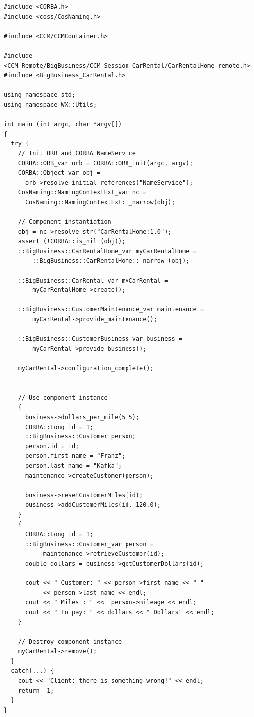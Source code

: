 \begin{small}
\begin{verbatim}
#include <CORBA.h>
#include <coss/CosNaming.h>

#include <CCM/CCMContainer.h>

#include <CCM_Remote/BigBusiness/CCM_Session_CarRental/CarRentalHome_remote.h>
#include <BigBusiness_CarRental.h>

using namespace std;
using namespace WX::Utils;

int main (int argc, char *argv[])
{
  try {
    // Init ORB and CORBA NameService
    CORBA::ORB_var orb = CORBA::ORB_init(argc, argv);
    CORBA::Object_var obj = 
      orb->resolve_initial_references("NameService");
    CosNaming::NamingContextExt_var nc =
      CosNaming::NamingContextExt::_narrow(obj);
    
    // Component instantiation
    obj = nc->resolve_str("CarRentalHome:1.0");
    assert (!CORBA::is_nil (obj));
    ::BigBusiness::CarRentalHome_var myCarRentalHome = 
        ::BigBusiness::CarRentalHome::_narrow (obj);

    ::BigBusiness::CarRental_var myCarRental = 
        myCarRentalHome->create();
    
    ::BigBusiness::CustomerMaintenance_var maintenance = 
        myCarRental->provide_maintenance();
    
    ::BigBusiness::CustomerBusiness_var business = 
        myCarRental->provide_business();
    
    myCarRental->configuration_complete();
    
    
    // Use component instance
    {
      business->dollars_per_mile(5.5);
      CORBA::Long id = 1;
      ::BigBusiness::Customer person;
      person.id = id;
      person.first_name = "Franz";
      person.last_name = "Kafka";
      maintenance->createCustomer(person);
    
      business->resetCustomerMiles(id);
      business->addCustomerMiles(id, 120.0);
    }
    {
      CORBA::Long id = 1;
      ::BigBusiness::Customer_var person = 
           maintenance->retrieveCustomer(id);
      double dollars = business->getCustomerDollars(id); 

      cout << " Customer: " << person->first_name << " " 
           << person->last_name << endl;
      cout << " Miles : " <<  person->mileage << endl;
      cout << " To pay: " << dollars << " Dollars" << endl;
    }

    // Destroy component instance
    myCarRental->remove();
  }
  catch(...) {
    cout << "Client: there is something wrong!" << endl;
    return -1;
  }
}
\end{verbatim}
\end{small}

